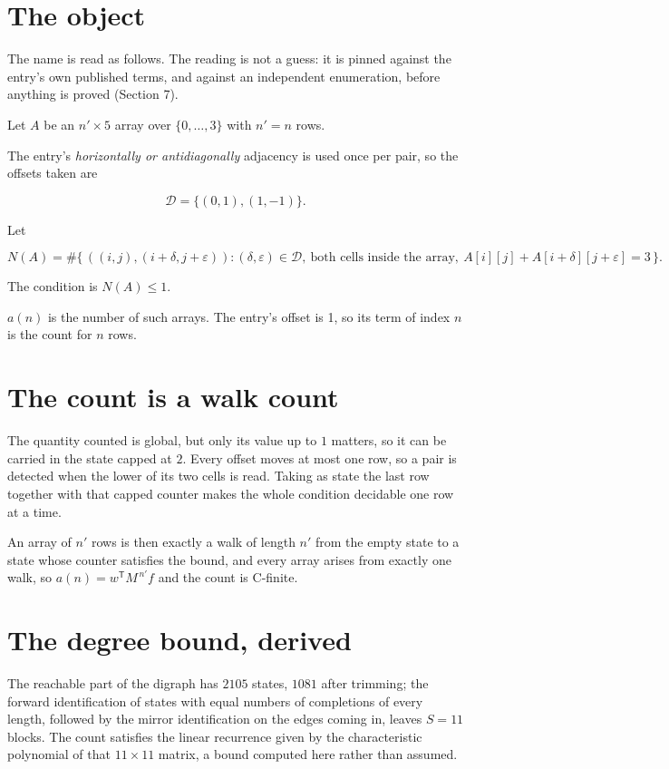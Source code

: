 \documentclass[11pt]{article}
\theoremstyle{definition}
\begin{document}
\section{The object}

The name is read as follows. The reading is not a guess: it is pinned against the entry's own published terms, and against an independent enumeration, before anything is proved (Section 7).

Let $A$ be an $n' \times 5$ array over $\{0,\dots,3\}$ with $n' = n$ rows.

The entry's {\itshape horizontally or antidiagonally} adjacency is used once per pair, so the offsets taken are

\[\mathcal{D} = \{(0,1), (1,-1)\}.\]

Let

\[N(A) = \#\bigl\{\,((i,j),(i{+}\delta,j{+}\varepsilon)) : (\delta,\varepsilon) \in \mathcal{D},\ \text{both cells inside the array},\ A[i][j] + A[i{+}\delta][j{+}\varepsilon] = 3\,\bigr\}.\]

The condition is $N(A) \le 1$.

$a(n)$ is the number of such arrays. The entry's offset is 1, so its term of index $n$ is the count for $n$ rows.

\section{The count is a walk count}

The quantity counted is global, but only its value up to $1$ matters, so it can be carried in the state capped at $2$. Every offset moves at most one row, so a pair is detected when the lower of its two cells is read. Taking as state the last row together with that capped counter makes the whole condition decidable one row at a time.

An array of $n'$ rows is then exactly a walk of length $n'$ from the empty state to a state whose counter satisfies the bound, and every array arises from exactly one walk, so $a(n) = w^{\mathsf T}M^{\,n'}f$ and the count is C-finite.

\section{The degree bound, derived}

The reachable part of the digraph has $2105$ states, $1081$ after trimming; the forward identification of states with equal numbers of completions of every length, followed by the mirror identification on the edges coming in, leaves $S = 11$ blocks. The count satisfies the linear recurrence given by the characteristic polynomial of that $11\times11$ matrix, a bound computed here rather than assumed.
\end{document}
